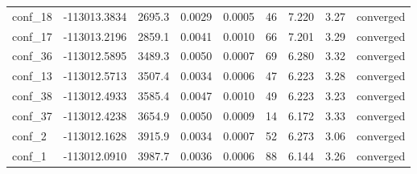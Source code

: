 \begin{longtable}{@{}lrrrrrrrl@{}}
conf\_18 & -113013.3834 & 2695.3 & 0.0029 & 0.0005 & 46 & 7.220 & 3.27 & converged \\
conf\_17 & -113013.2196 & 2859.1 & 0.0041 & 0.0010 & 66 & 7.201 & 3.29 & converged \\
conf\_36 & -113012.5895 & 3489.3 & 0.0050 & 0.0007 & 69 & 6.280 & 3.32 & converged \\
conf\_13 & -113012.5713 & 3507.4 & 0.0034 & 0.0006 & 47 & 6.223 & 3.28 & converged \\
conf\_38 & -113012.4933 & 3585.4 & 0.0047 & 0.0010 & 49 & 6.223 & 3.23 & converged \\
conf\_37 & -113012.4238 & 3654.9 & 0.0050 & 0.0009 & 14 & 6.172 & 3.33 & converged \\
conf\_2 & -113012.1628 & 3915.9 & 0.0034 & 0.0007 & 52 & 6.273 & 3.06 & converged \\
conf\_1 & -113012.0910 & 3987.7 & 0.0036 & 0.0006 & 88 & 6.144 & 3.26 & converged \\
\end{longtable}
